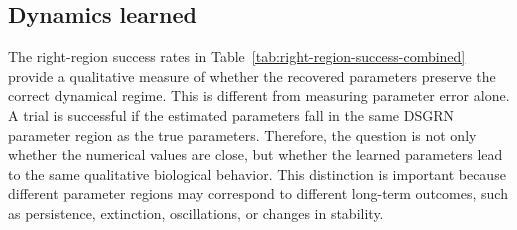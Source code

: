 \documentclass[11pt]{article}
\begin{document}
\subsection{Dynamics learned}

The right-region success rates in Table~\ref{tab:right-region-success-combined} provide a qualitative measure of whether the recovered parameters preserve the correct dynamical regime. This is different from measuring parameter error alone. A trial is successful if the estimated parameters fall in the same DSGRN parameter region as the true parameters. Therefore, the question is not only whether the numerical values are close, but whether the learned parameters lead to the same qualitative biological behavior. This distinction is important because different parameter regions may correspond to different long-term outcomes, such as persistence, extinction, oscillations, or changes in stability.
\end{document}
